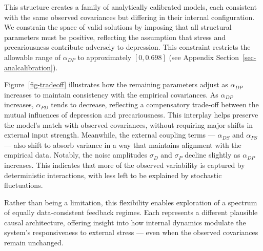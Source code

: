 \documentclass[
]{article}
\begin{document}
This structure creates a family of analytically calibrated models, each
consistent with the same observed covariances but differing in their
internal configuration. We constrain the space of valid solutions by
imposing that all structural parameters must be positive, reflecting the
assumption that stress and precariousness contribute adversely to
depression. This constraint restricts the allowable range of
\(\alpha_{DP}\) to approximately \([0, 0.698]\) (see Appendix
Section~\ref{sec-analcalibration}).

Figure~\ref{fig-tradeoff} illustrates how the remaining parameters
adjust as \(\alpha_{DP}\) increases to maintain consistency with the
empirical covariances. As \(\alpha_{DP}\) increases, \(\alpha_{PD}\)
tends to decrease, reflecting a compensatory trade-off between the
mutual influences of depression and precariousness. This interplay helps
preserve the model's match with observed covariances, without requiring
major shifts in external input strength. Meanwhile, the external
coupling terms --- \(\alpha_{DS}\) and \(\alpha_{PS}\) --- also shift to
absorb variance in a way that maintains alignment with the empirical
data. Notably, the noise amplitudes \(\sigma_D\) and \(\sigma_P\)
decline slightly as \(\alpha_{DP}\) increases. This indicates that more
of the observed variability is captured by deterministic interactions,
with less left to be explained by stochastic fluctuations.

Rather than being a limitation, this flexibility enables exploration of
a spectrum of equally data-consistent feedback regimes. Each represents
a different plausible causal architecture, offering insight into how
internal dynamics modulate the system's responsiveness to external
stress --- even when the observed covariances remain unchanged.
\end{document}
